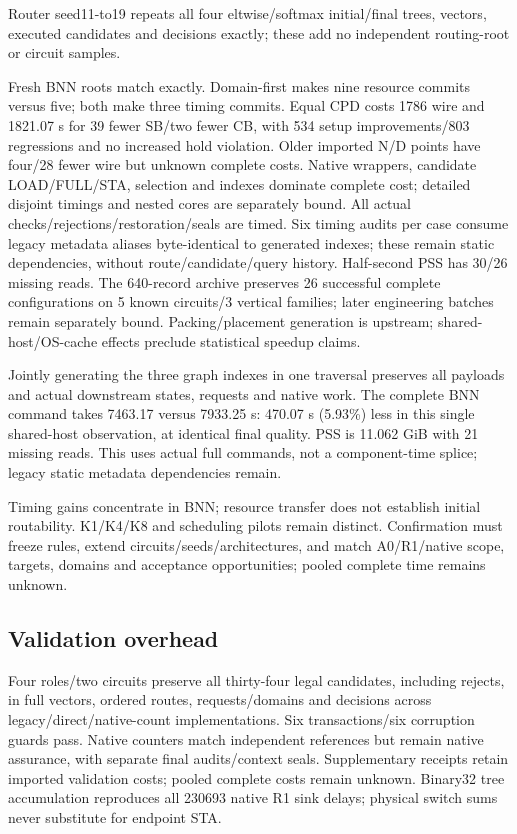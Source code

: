 \documentclass[conference,10pt]{IEEEtran}
\begin{document}
Router seed11-to19 repeats all four eltwise/softmax initial/final trees, vectors, executed candidates and decisions exactly; these add no independent routing-root or circuit samples.

Fresh BNN roots match exactly. Domain-first makes nine resource commits versus five; both make three timing commits. Equal CPD costs 1786 wire and 1821.07 s for 39 fewer SB/two fewer CB, with 534 setup improvements/803 regressions and no increased hold violation. Older imported N/D points have four/28 fewer wire but unknown complete costs. Native wrappers, candidate LOAD/FULL/STA, selection and indexes dominate complete cost; detailed disjoint timings and nested cores are separately bound. All actual checks/rejections/restoration/seals are timed. Six timing audits per case consume legacy metadata aliases byte-identical to generated indexes; these remain static dependencies, without route/candidate/query history. Half-second PSS has 30/26 missing reads. The 640-record archive preserves 26 successful complete configurations on 5 known circuits/3 vertical families; later engineering batches remain separately bound. Packing/placement generation is upstream; shared-host/OS-cache effects preclude statistical speedup claims.

Jointly generating the three graph indexes in one traversal preserves all payloads and actual downstream states, requests and native work. The complete BNN command takes 7463.17 versus 7933.25 s: 470.07 s (5.93\%) less in this single shared-host observation, at identical final quality. PSS is 11.062 GiB with 21 missing reads. This uses actual full commands, not a component-time splice; legacy static metadata dependencies remain.

Timing gains concentrate in BNN; resource transfer does not establish initial routability. K1/K4/K8 and scheduling pilots remain distinct. Confirmation must freeze rules, extend circuits/seeds/architectures, and match A0/R1/native scope, targets, domains and acceptance opportunities; pooled complete time remains unknown.

\subsection{Validation overhead}
Four roles/two circuits preserve all thirty-four legal candidates, including rejects, in full vectors, ordered routes, requests/domains and decisions across legacy/direct/native-count implementations. Six transactions/six corruption guards pass. Native counters match independent references but remain native assurance, with separate final audits/context seals. Supplementary receipts retain imported validation costs; pooled complete costs remain unknown. Binary32 tree accumulation reproduces all 230693 native R1 sink delays; physical switch sums never substitute for endpoint STA.
\end{document}
